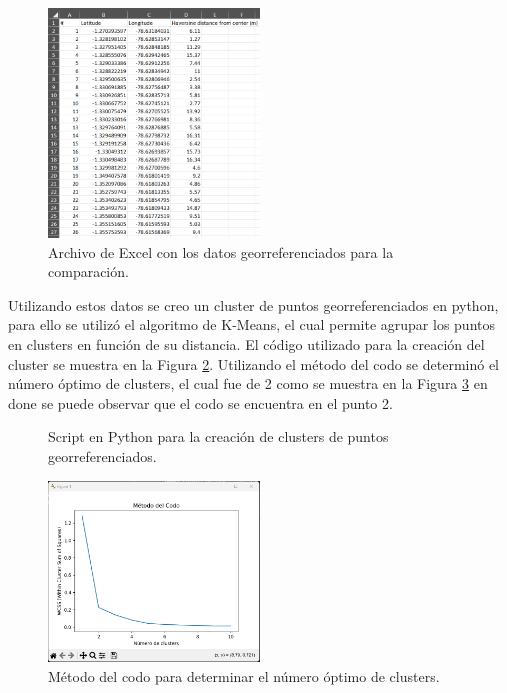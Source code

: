 \begin{figure}[H]
    \centering
    \includegraphics[width=0.5\textwidth]{chapters/III-resultados-y-discusion/resources/images/archivo-excel-georreferenciacion.png}
    \caption{Archivo de Excel con los datos georreferenciados para la comparación.}
    \label{fig:archivo-excel-georreferenciacion}
\end{figure}

Utilizando estos datos se creo un cluster de puntos georreferenciados en python, para ello se utilizó el algoritmo de K-Means, el cual
permite agrupar los puntos en clusters en función de su distancia. El código utilizado para la creación del cluster se muestra en la
Figura \ref{fig:script-cluster-python}. Utilizando el método del codo se determinó el número óptimo de clusters, el cual fue de 2 como
se muestra en la Figura \ref{fig:metodo-del-codo} en done se puede observar que el codo se encuentra en el punto 2.

\begin{figure}[H]
    
    \caption{Script en Python para la creación de clusters de puntos georreferenciados.}
    \label{fig:script-cluster-python}
\end{figure}

\begin{figure}[H]
    \centering
    \includegraphics[width=0.5\textwidth]{chapters/III-resultados-y-discusion/resources/images/metodo-del-codo.png}
    \caption{Método del codo para determinar el número óptimo de clusters.}
    \label{fig:metodo-del-codo}
\end{figure}


